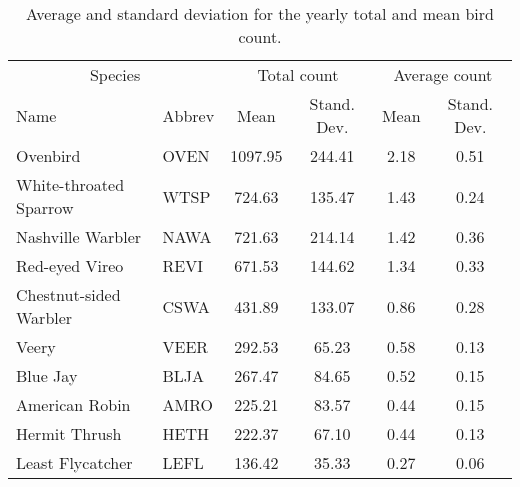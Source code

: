 \documentclass[a4paper]{article}
\begin{document}
\begin{table}[ht]
\centering
\caption{Average and standard deviation for the yearly total and mean bird count.}
\label{count07}
\begin{tabular}{llcccc}
  \hline
  \multicolumn{2}{c}{Species} & \multicolumn{2}{c}{Total count} & \multicolumn{2}{c}{Average count} \\
Name & Abbrev & Mean & Stand. Dev. & Mean & Stand. Dev.  \\ 
  \hline
Ovenbird & OVEN & 1097.95 & 244.41 & 2.18 & 0.51 \\ 
  White-throated Sparrow & WTSP & 724.63 & 135.47 & 1.43 & 0.24 \\ 
  Nashville Warbler & NAWA & 721.63 & 214.14 & 1.42 & 0.36 \\ 
  Red-eyed Vireo & REVI & 671.53 & 144.62 & 1.34 & 0.33 \\ 
  Chestnut-sided Warbler & CSWA & 431.89 & 133.07 & 0.86 & 0.28 \\ 
  Veery & VEER & 292.53 & 65.23 & 0.58 & 0.13 \\ 
  Blue Jay & BLJA & 267.47 & 84.65 & 0.52 & 0.15 \\ 
  American Robin & AMRO & 225.21 & 83.57 & 0.44 & 0.15 \\ 
  Hermit Thrush & HETH & 222.37 & 67.10 & 0.44 & 0.13 \\ 
  Least Flycatcher & LEFL & 136.42 & 35.33 & 0.27 & 0.06 \\ 
   \hline
\end{tabular}
\end{table}
\end{document}
